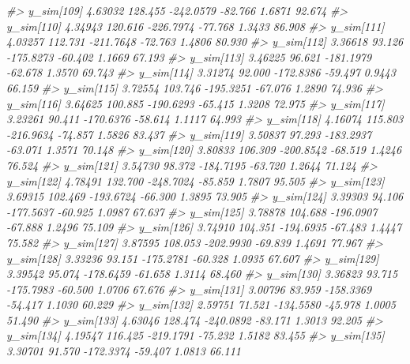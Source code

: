 \documentclass[
  10pt,
  italian,
  a4paper,
  extrafontsizes,onecolumn,openright
  ]{memoir}
\newenvironment{Shaded}{\begin{snugshade}}{\end{snugshade}}
\newcommand{\CommentTok}[1]{\textcolor[rgb]{0.56,0.35,0.01}{\textit{#1}}}
\begin{document}
\begin{Shaded}
\begin{Highlighting}[]
\CommentTok{\#\textgreater{}   y\_sim[109]  4.63032 128.455 {-}242.0579 {-}82.766  1.6871  92.674}
\CommentTok{\#\textgreater{}   y\_sim[110]  4.34943 120.616 {-}226.7974 {-}77.768  1.3433  86.908}
\CommentTok{\#\textgreater{}   y\_sim[111]  4.03257 112.731 {-}211.7648 {-}72.763  1.4806  80.930}
\CommentTok{\#\textgreater{}   y\_sim[112]  3.36618  93.126 {-}175.8273 {-}60.402  1.1669  67.193}
\CommentTok{\#\textgreater{}   y\_sim[113]  3.46225  96.621 {-}181.1979 {-}62.678  1.3570  69.743}
\CommentTok{\#\textgreater{}   y\_sim[114]  3.31274  92.000 {-}172.8386 {-}59.497  0.9443  66.159}
\CommentTok{\#\textgreater{}   y\_sim[115]  3.72554 103.746 {-}195.3251 {-}67.076  1.2890  74.936}
\CommentTok{\#\textgreater{}   y\_sim[116]  3.64625 100.885 {-}190.6293 {-}65.415  1.3208  72.975}
\CommentTok{\#\textgreater{}   y\_sim[117]  3.23261  90.411 {-}170.6376 {-}58.614  1.1117  64.993}
\CommentTok{\#\textgreater{}   y\_sim[118]  4.16074 115.803 {-}216.9634 {-}74.857  1.5826  83.437}
\CommentTok{\#\textgreater{}   y\_sim[119]  3.50837  97.293 {-}183.2937 {-}63.071  1.3571  70.148}
\CommentTok{\#\textgreater{}   y\_sim[120]  3.80833 106.309 {-}200.8542 {-}68.519  1.4246  76.524}
\CommentTok{\#\textgreater{}   y\_sim[121]  3.54730  98.372 {-}184.7195 {-}63.720  1.2644  71.124}
\CommentTok{\#\textgreater{}   y\_sim[122]  4.78491 132.700 {-}248.7024 {-}85.859  1.7807  95.505}
\CommentTok{\#\textgreater{}   y\_sim[123]  3.69315 102.469 {-}193.6724 {-}66.300  1.3895  73.905}
\CommentTok{\#\textgreater{}   y\_sim[124]  3.39303  94.106 {-}177.5637 {-}60.925  1.0987  67.637}
\CommentTok{\#\textgreater{}   y\_sim[125]  3.78878 104.688 {-}196.0907 {-}67.888  1.2496  75.109}
\CommentTok{\#\textgreater{}   y\_sim[126]  3.74910 104.351 {-}194.6935 {-}67.483  1.4447  75.582}
\CommentTok{\#\textgreater{}   y\_sim[127]  3.87595 108.053 {-}202.9930 {-}69.839  1.4691  77.967}
\CommentTok{\#\textgreater{}   y\_sim[128]  3.33236  93.151 {-}175.2781 {-}60.328  1.0935  67.607}
\CommentTok{\#\textgreater{}   y\_sim[129]  3.39542  95.074 {-}178.6459 {-}61.658  1.3114  68.460}
\CommentTok{\#\textgreater{}   y\_sim[130]  3.36823  93.715 {-}175.7983 {-}60.500  1.0706  67.676}
\CommentTok{\#\textgreater{}   y\_sim[131]  3.00796  83.959 {-}158.3369 {-}54.417  1.1030  60.229}
\CommentTok{\#\textgreater{}   y\_sim[132]  2.59751  71.521 {-}134.5580 {-}45.978  1.0005  51.490}
\CommentTok{\#\textgreater{}   y\_sim[133]  4.63046 128.474 {-}240.0892 {-}83.171  1.3013  92.205}
\CommentTok{\#\textgreater{}   y\_sim[134]  4.19547 116.425 {-}219.1791 {-}75.232  1.5182  83.455}
\CommentTok{\#\textgreater{}   y\_sim[135]  3.30701  91.570 {-}172.3374 {-}59.407  1.0813  66.111}

\end{Highlighting}
\end{Shaded}
\end{document}
